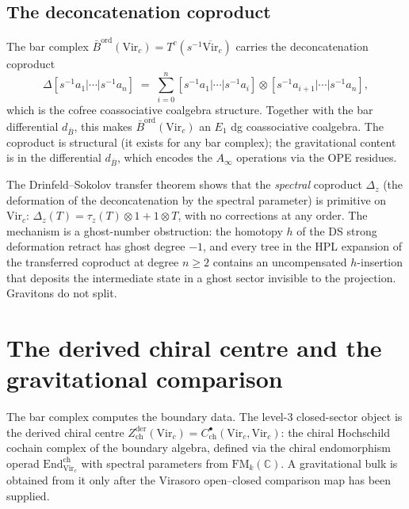 \documentclass[11pt,reqno]{amsart}
\theoremstyle{definition}
\theoremstyle{remark}
\begin{document}
\subsection{The deconcatenation coproduct}

The bar complex $\bar{B}^{\mathrm{ord}}(\mathrm{Vir}_c)
= T^c(s^{-1}\overline{\mathrm{Vir}}_c)$
carries the deconcatenation coproduct
\begin{equation}\label{eq:deconc}
\Delta[s^{-1}a_1 | \cdots | s^{-1}a_n]
\;=\;
\sum_{i=0}^{n}
[s^{-1}a_1 | \cdots | s^{-1}a_i]
\otimes
[s^{-1}a_{i+1} | \cdots | s^{-1}a_n],
\end{equation}
which is the cofree coassociative coalgebra structure. Together with
the bar differential $d_{\bar{B}}$, this makes
$\bar{B}^{\mathrm{ord}}(\mathrm{Vir}_c)$ an $E_1$ dg coassociative
coalgebra. The coproduct is structural (it exists for any bar
complex); the gravitational content is in the differential $d_{\bar{B}}$,
which encodes the $A_\infty$ operations via the OPE residues.

The Drinfeld--Sokolov transfer theorem shows that the \emph{spectral}
coproduct $\Delta_z$ (the deformation of the deconcatenation by the
spectral parameter) is primitive on $\mathrm{Vir}_c$:
$\Delta_z(T) = \tau_z(T) \otimes 1 + 1 \otimes T$, with no corrections
at any order. The mechanism is a ghost-number obstruction: the
homotopy $h$ of the DS strong deformation retract has ghost degree
$-1$, and every tree in the HPL expansion of the transferred
coproduct at degree $n \ge 2$ contains an uncompensated
$h$-insertion that deposits the intermediate state in a ghost sector
invisible to the projection. Gravitons do not split.

\section{The derived chiral centre and the gravitational comparison}
\label{sec:gravitational-bulk}

The bar complex computes the boundary data. The level-$3$
closed-sector object is the derived chiral centre
$Z^{\mathrm{der}}_{\mathrm{ch}}(\mathrm{Vir}_c)
= C^\bullet_{\mathrm{ch}}(\mathrm{Vir}_c, \mathrm{Vir}_c)$:
the chiral Hochschild cochain complex of the boundary algebra,
defined via the chiral endomorphism operad
$\mathrm{End}^{\mathrm{ch}}_{\mathrm{Vir}_c}$ with spectral
parameters from $\mathrm{FM}_k(\mathbb{C})$. A gravitational bulk is
obtained from it only after the Virasoro open--closed comparison map
has been supplied.
\end{document}
